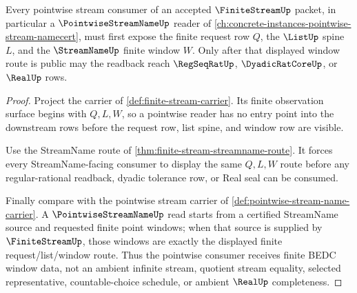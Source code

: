 \begin{theorem}
\label{thm:finite-stream-pointwise-stream-forward-route}
Every pointwise stream consumer of an accepted $\FiniteStreamUp$ packet, in particular a $\PointwiseStreamNameUp$ reader of \autoref{ch:concrete-instances-pointwise-stream-namecert}, must first expose the finite request row $Q$, the $\ListUp$ spine $L$, and the $\StreamNameUp$ finite window $W$. Only after that displayed window route is public may the readback reach $\RegSeqRatUp$, $\DyadicRatCoreUp$, or $\RealUp$ rows.
\end{theorem}
\begin{proof}
Project the carrier of \autoref{def:finite-stream-carrier}. Its finite observation surface begins with $Q,L,W$, so a pointwise reader has no entry point into the downstream rows before the request row, list spine, and window row are visible.

Use the StreamName route of \autoref{thm:finite-stream-streamname-route}. It forces every StreamName-facing consumer to display the same $Q,L,W$ route before any regular-rational readback, dyadic tolerance row, or Real seal can be consumed.

Finally compare with the pointwise stream carrier of \autoref{def:pointwise-stream-name-carrier}. A $\PointwiseStreamNameUp$ read starts from a certified StreamName source and requested finite point windows; when that source is supplied by $\FiniteStreamUp$, those windows are exactly the displayed finite request/list/window route. Thus the pointwise consumer receives finite BEDC window data, not an ambient infinite stream, quotient stream equality, selected representative, countable-choice schedule, or ambient $\RealUp$ completeness.
\end{proof}

